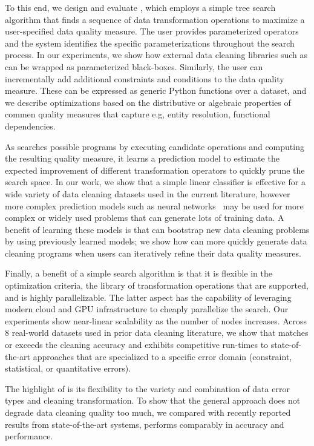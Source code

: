 To this end, we design and evaluate \sys, which employs a simple tree search algorithm that finds a sequence of data transformation operations to maximize a user-specified data quality measure.   The user provides parameterized operators and the system identifiez the specific parameterizations throughout the search process.  In our experiments, we show how external data cleaning libraries such as  can be wrapped as parameterized black-boxes.  Similarly, the user can incrementally add additional constraints and conditions to the data quality measure.  These can be expressed as generic Python functions over a dataset, and we describe optimizations based on the distributive or algebraic properties of commen quality measures that capture e.g, entity resolution, functional dependencies.

As \sys searches possible programs by executing candidate operations and computing the resulting quality measure, it learns a prediction model to estimate the expected improvement of different transformation operators to quickly prune the search space.  In our work, we show that a simple linear classifier is effective for a wide variety of data cleaning datasets used in the current literature, however more complex prediction models such as neural networks~\cite{} may be used for more complex or widely used problems that can generate lots of training data.   A benefit of learning these models is that \sys can bootstrap new data cleaning problems by using previously learned models; we show how \sys can more quickly generate data cleaning programs when users can iteratively refine their data quality measures.

Finally, a benefit of a simple search algorithm is that it is flexible in the optimization criteria, the library of transformation operations that are supported, and is highly parallelizable.  The latter aspect has the capability of leveraging modern cloud and GPU infrastructure to cheaply parallelize the search.  Our experiments show near-linear scalability as the number of nodes increases.
Across 8 real-world datasets used in prior data cleaning literature, we show that \sys matches or exceeds the cleaning accuracy and exhibits competitive run-times to state-of-the-art approaches that are specialized to a specific error domain (constraint, statistical, or quantitative errors).  

The highlight of \sys is its flexibility to the variety and combination of data error types and cleaning transformation.   To show that the general approach does not degrade data cleaning quality too much, we compared with recently reported results from state-of-the-art systems, \sys performs comparably in accuracy and performance.


